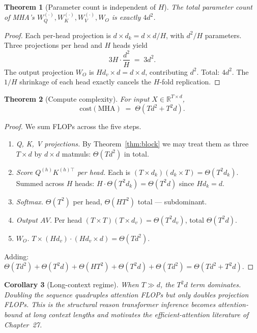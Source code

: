 \documentclass[11pt]{article}
\newtheorem{theorem}{Theorem}[section]
\newtheorem{corollary}[theorem]{Corollary}
\theoremstyle{remark}
\begin{document}
\begin{theorem}[Parameter count is independent of $H$]
\label{thm:params}
The total parameter count of MHA's $W_Q^{(\cdot)}, W_K^{(\cdot)}, W_V^{(\cdot)}, W_O$ is exactly $4 d^2$.
\end{theorem}
\begin{proof}
Each per-head projection is $d \times d_k = d \times d/H$, with $d^2/H$ parameters. Three projections per head and $H$ heads yield
\[
3 H \cdot \frac{d^2}{H} \;=\; 3 d^2.
\]
The output projection $W_O$ is $H d_v \times d = d \times d$, contributing $d^2$. Total: $4 d^2$. The $1/H$ shrinkage of each head exactly cancels the $H$-fold replication.
\end{proof}

\begin{theorem}[Compute complexity]
\label{thm:compute}
For input $X \in \mathbb{R}^{T \times d}$,
\[
\boxed{\;\mathrm{cost}(\mathrm{MHA}) \;=\; \Theta(T d^2 + T^2 d).\;}
\]
\end{theorem}
\begin{proof}
We sum FLOPs across the five steps.
\begin{enumerate}
  \item \emph{Q, K, V projections.} By Theorem~\ref{thm:block} we may treat them as three $T \times d$ by $d \times d$ matmuls: $\Theta(T d^2)$ in total.
  \item \emph{Score $Q^{(h)} K^{(h)\top}$ per head.} Each is $(T \times d_k)(d_k \times T) = \Theta(T^2 d_k)$. Summed across $H$ heads: $H \cdot \Theta(T^2 d_k) = \Theta(T^2 d)$ since $H d_k = d$.
  \item \emph{Softmax.} $\Theta(T^2)$ per head, $\Theta(H T^2)$ total --- subdominant.
  \item \emph{Output $A V$.} Per head $(T \times T)(T \times d_v) = \Theta(T^2 d_v)$, total $\Theta(T^2 d)$.
  \item \emph{$W_O$.} $T \times (H d_v) \cdot (H d_v \times d) = \Theta(T d^2)$.
\end{enumerate}
Adding: $\Theta(T d^2) + \Theta(T^2 d) + \Theta(H T^2) + \Theta(T^2 d) + \Theta(T d^2) = \Theta(T d^2 + T^2 d)$.
\end{proof}

\begin{corollary}[Long-context regime]
When $T \gg d$, the $T^2 d$ term dominates. Doubling the sequence quadruples attention FLOPs but only doubles projection FLOPs. This is the structural reason transformer inference becomes attention-bound at long context lengths and motivates the efficient-attention literature of Chapter~27.
\end{corollary}
\end{document}
